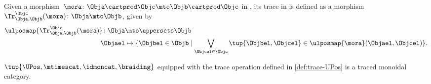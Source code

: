\begin{definition}
    \label{def:trace-UPos}
    Given a morphism~$\mora\colon \Obja \cartprod \Objc \mto \Objb\cartprod \Objc$ in \UPos, its trace in is defined as a morphism~$\Tr_{\Obja,\Objb}^{\Objc}(\mora)\colon \Obja \mto \Objb$, given by
    \begin{equation}
        \begin{aligned}
            \ulposmap{\Tr_{\Obja,\Objb}^{\Objc}(\mora)}\colon \Obja & \mto \uppersets \Objb                                                                                                      \\
            \Objael                                                 & \mapsto \{\Objbel \in \Objb \mid \bigvee_{\Objcel \in \Objc}\tup{\Objbel, \Objcel}\in \ulposmap{\mora}(\Objael,\Objcel)\}.
        \end{aligned}
    \end{equation}
\end{definition}
\begin{lemma}
    \label{lem:UPos-is-traced}
    $\tup{\UPos,\mtimescat, \idmoncat,\braiding}$ equipped with the trace operation defined in \cref{def:trace-UPos} is a traced monoidal category.
\end{lemma}

